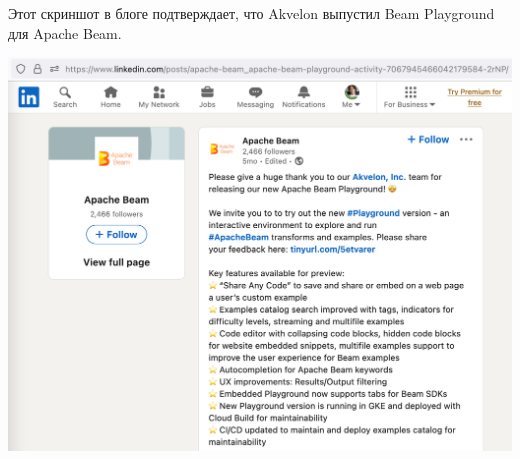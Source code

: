 
Этот скриншот в блоге подтверждает, что Akvelon
выпустил Beam Playground для Apache Beam.

\includegraphics[width=\textwidth]{beam-akvelon-announcement}

\pagebreak
